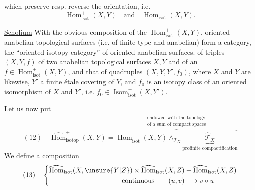 which preserve resp. reverse the orientation, i.e.
\[
\operatorname{Hom}_{\mathrm{isot}}^+(X,Y)\quad\text{and}\quad\operatorname{Hom}_{\mathrm{isot}}^-(X,Y).
\]

\uline{Scholium} With the obvious composition of the $\operatorname{Hom}_{\mathrm{isot}}^+(X,Y)$, oriented anabelian topological surfaces (i.e. of finite type and anabelian)  form a category, the ``oriented isotopy category'' of oriented anabelian surfaces.   of triples $(X,Y,f)$ of two anabelian topological surfaces $X,Y$ and of an $f\in\operatorname{Hom}_{\mathrm{isot}}^+(X,Y)$, and that of quadruples $(X,Y,Y',f_0)$, where $X$ and $Y$ are likewise, $Y'$ a finite étale covering of $Y$, and $f_0$ is an isotopy class of an oriented isomorphism of $X$ and $Y'$, i.e. $f_0\in\operatorname{Isom}_{\mathrm{isot}}^+(X,Y')$.

Let us now put
\[
(12)\quad
\widehat{\operatorname{Hom}}^{+}_{\mathrm{isotop}}(X,Y)
=\overbrace{\operatorname{Hom}^{+}_{\mathrm{isot}}(X,Y)\mathop{\wedge}_{\mathcal{T}_X}
\underbrace{\widehat{\mathcal{T}}_X}_{\text{profinite compactification}}}^{\substack{\text{endowed with the topology}\\\text{of a sum of compact spaces}}}
\]
We define a composition
\[
(13)\quad\left\{
\begin{aligned}
\widehat{\operatorname{Hom}}_{\mathrm{isot}}(X,\unsure{Y|Z})\times
\widehat{\operatorname{Hom}}_{\mathrm{isot}}(X,Z)
&\mathbin{-}\widehat{\operatorname{Hom}}_{\mathrm{isot}}(X,Z)\\
\text{continuous}\qquad (u,v)&\longmapsto v\circ u
\end{aligned}\right.
\]
